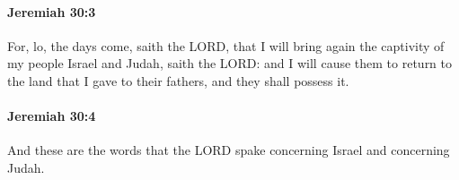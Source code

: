 		\paragraph{Jeremiah 30:3} %
			\label{JEREMIAH-30-3}

			For, lo, the days come, saith the LORD, that I will bring again the captivity of my people Israel and Judah, saith the LORD: and I will cause them to return to the land that I gave to their fathers, and they shall possess it.


		\paragraph{Jeremiah 30:4} %
			\label{JEREMIAH-30-4}

			And these are the words that the LORD spake concerning Israel and concerning Judah.


